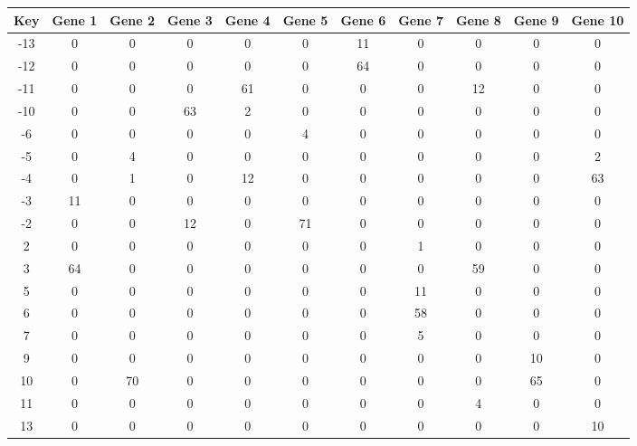 \begin{tabular}{|c|c|c|c|c|c|c|c|c|c|c|}
\hline
Key & Gene 1 & Gene 2 & Gene 3 & Gene 4 & Gene 5 & Gene 6 & Gene 7 & Gene 8 & Gene 9 & Gene 10 \\
\hline
-13 & 0 & 0 & 0 & 0 & 0 & 11 & 0 & 0 & 0 & 0 \\
-12 & 0 & 0 & 0 & 0 & 0 & 64 & 0 & 0 & 0 & 0 \\
-11 & 0 & 0 & 0 & 61 & 0 & 0 & 0 & 12 & 0 & 0 \\
-10 & 0 & 0 & 63 & 2 & 0 & 0 & 0 & 0 & 0 & 0 \\
-6 & 0 & 0 & 0 & 0 & 4 & 0 & 0 & 0 & 0 & 0 \\
-5 & 0 & 4 & 0 & 0 & 0 & 0 & 0 & 0 & 0 & 2 \\
-4 & 0 & 1 & 0 & 12 & 0 & 0 & 0 & 0 & 0 & 63 \\
-3 & 11 & 0 & 0 & 0 & 0 & 0 & 0 & 0 & 0 & 0 \\
-2 & 0 & 0 & 12 & 0 & 71 & 0 & 0 & 0 & 0 & 0 \\
2 & 0 & 0 & 0 & 0 & 0 & 0 & 1 & 0 & 0 & 0 \\
3 & 64 & 0 & 0 & 0 & 0 & 0 & 0 & 59 & 0 & 0 \\
5 & 0 & 0 & 0 & 0 & 0 & 0 & 11 & 0 & 0 & 0 \\
6 & 0 & 0 & 0 & 0 & 0 & 0 & 58 & 0 & 0 & 0 \\
7 & 0 & 0 & 0 & 0 & 0 & 0 & 5 & 0 & 0 & 0 \\
9 & 0 & 0 & 0 & 0 & 0 & 0 & 0 & 0 & 10 & 0 \\
10 & 0 & 70 & 0 & 0 & 0 & 0 & 0 & 0 & 65 & 0 \\
11 & 0 & 0 & 0 & 0 & 0 & 0 & 0 & 4 & 0 & 0 \\
13 & 0 & 0 & 0 & 0 & 0 & 0 & 0 & 0 & 0 & 10 \\
\hline
\end{tabular}
